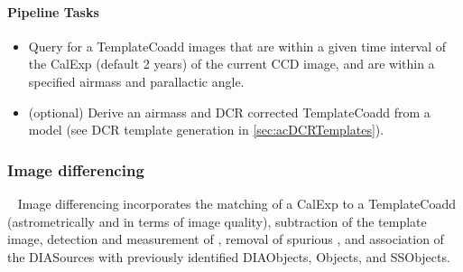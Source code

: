 \paragraph{Pipeline Tasks}
\begin{itemize}
\item Query for a TemplateCoadd images that are within a given time interval of the CalExp  (default 2 years) of the current CCD image, and are within a specified airmass and parallactic angle.
\item (optional) Derive an airmass and DCR corrected TemplateCoadd from a model (see DCR template generation in \ref{sec:acDCRTemplates}). 
\end{itemize}

\subsubsection{Image differencing}~
Image differencing incorporates the matching of a CalExp to a TemplateCoadd (astrometrically and in terms of image quality), subtraction of the template image, detection and measurement of \DIASources, removal of spurious \DIASources, and association of the DIASources with previously identified DIAObjects, Objects, and SSObjects. 


